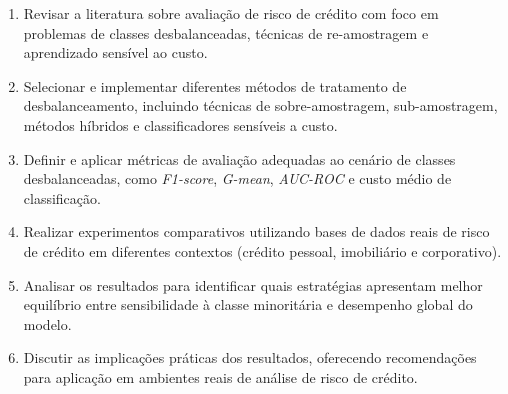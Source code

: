 \begin{enumerate}
  \item Revisar a literatura sobre avaliação de risco de crédito com foco em problemas de classes desbalanceadas, técnicas de re-amostragem e aprendizado sensível ao custo.
  \item Selecionar e implementar diferentes métodos de tratamento de desbalanceamento, incluindo técnicas de sobre-amostragem, sub-amostragem, métodos híbridos e classificadores sensíveis a custo.
  \item Definir e aplicar métricas de avaliação adequadas ao cenário de classes desbalanceadas, como \textit{F1-score}, \textit{G-mean}, \textit{AUC-ROC} e custo médio de classificação.
  \item Realizar experimentos comparativos utilizando bases de dados reais de risco de crédito em diferentes contextos (crédito pessoal, imobiliário e corporativo).
  \item Analisar os resultados para identificar quais estratégias apresentam melhor equilíbrio entre sensibilidade à classe minoritária e desempenho global do modelo.
  \item Discutir as implicações práticas dos resultados, oferecendo recomendações para aplicação em ambientes reais de análise de risco de crédito.
\end{enumerate}
